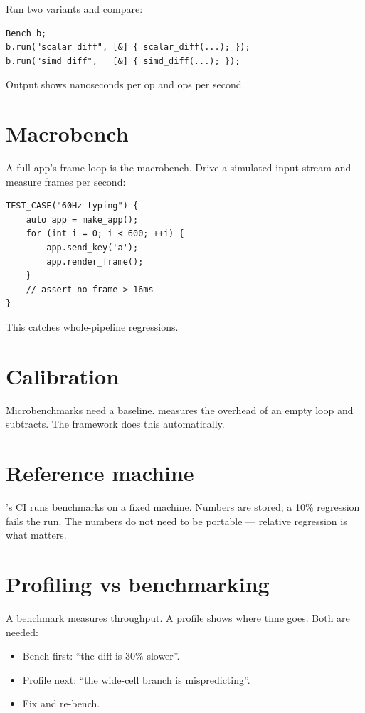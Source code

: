 Run two variants and compare:

\begin{lstlisting}
Bench b;
b.run("scalar diff", [&] { scalar_diff(...); });
b.run("simd diff",   [&] { simd_diff(...); });
\end{lstlisting}

Output shows nanoseconds per op and ops per second.

\section{Macrobench}

A full app's frame loop is the macrobench. Drive a simulated
input stream and measure frames per second:

\begin{lstlisting}
TEST_CASE("60Hz typing") {
    auto app = make_app();
    for (int i = 0; i < 600; ++i) {
        app.send_key('a');
        app.render_frame();
    }
    // assert no frame > 16ms
}
\end{lstlisting}

This catches whole-pipeline regressions.

\section{Calibration}

Microbenchmarks need a baseline. \maya{} measures the
overhead of an empty loop and subtracts. The framework does
this automatically.

\section{Reference machine}

\maya{}'s CI runs benchmarks on a fixed machine. Numbers
are stored; a 10\% regression fails the run. The numbers do
not need to be portable --- relative regression is what
matters.

\section{Profiling vs benchmarking}

A benchmark measures throughput. A profile shows where time
goes. Both are needed:

\begin{itemize}[leftmargin=*]
  \item Bench first: ``the diff is 30\% slower''.
  \item Profile next: ``the wide-cell branch is mispredicting''.
  \item Fix and re-bench.
\end{itemize}

